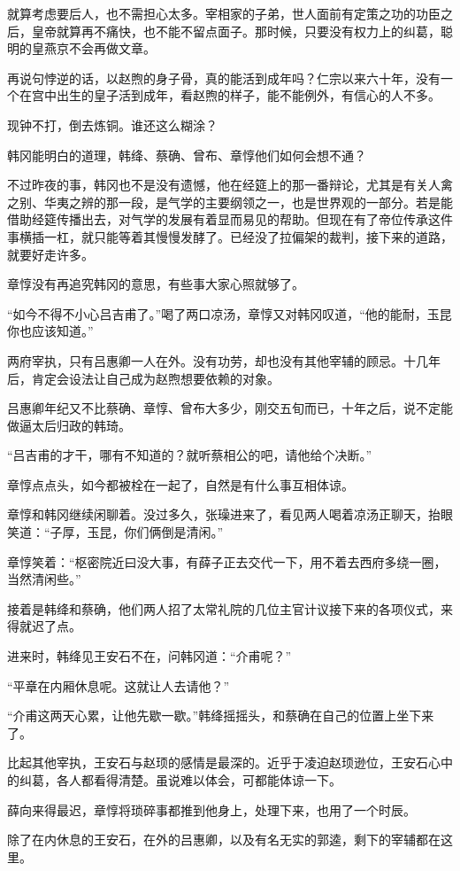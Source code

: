 就算考虑要后人，也不需担心太多。宰相家的子弟，世人面前有定策之功的功臣之后，皇帝就算再不痛快，也不能不留点面子。那时候，只要没有权力上的纠葛，聪明的皇燕京不会再做文章。

再说句悖逆的话，以赵煦的身子骨，真的能活到成年吗？仁宗以来六十年，没有一个在宫中出生的皇子活到成年，看赵煦的样子，能不能例外，有信心的人不多。

现钟不打，倒去炼铜。谁还这么糊涂？

韩冈能明白的道理，韩绛、蔡确、曾布、章惇他们如何会想不通？

不过昨夜的事，韩冈也不是没有遗憾，他在经筵上的那一番辩论，尤其是有关人禽之别、华夷之辨的那一段，是气学的主要纲领之一，也是世界观的一部分。若是能借助经筵传播出去，对气学的发展有着显而易见的帮助。但现在有了帝位传承这件事横插一杠，就只能等着其慢慢发酵了。已经没了拉偏架的裁判，接下来的道路，就要好走许多。

章惇没有再追究韩冈的意思，有些事大家心照就够了。

“如今不得不小心吕吉甫了。”喝了两口凉汤，章惇又对韩冈叹道，“他的能耐，玉昆你也应该知道。”

两府宰执，只有吕惠卿一人在外。没有功劳，却也没有其他宰辅的顾忌。十几年后，肯定会设法让自己成为赵煦想要依赖的对象。

吕惠卿年纪又不比蔡确、章惇、曾布大多少，刚交五旬而已，十年之后，说不定能做逼太后归政的韩琦。

“吕吉甫的才干，哪有不知道的？就听蔡相公的吧，请他给个决断。”

章惇点点头，如今都被栓在一起了，自然是有什么事互相体谅。

章惇和韩冈继续闲聊着。没过多久，张璪进来了，看见两人喝着凉汤正聊天，抬眼笑道：“子厚，玉昆，你们俩倒是清闲。”

章惇笑着：“枢密院近曰没大事，有薛子正去交代一下，用不着去西府多绕一圈，当然清闲些。”

接着是韩绛和蔡确，他们两人招了太常礼院的几位主官计议接下来的各项仪式，来得就迟了点。

进来时，韩绛见王安石不在，问韩冈道：“介甫呢？”

“平章在内厢休息呢。这就让人去请他？”

“介甫这两天心累，让他先歇一歇。”韩绛摇摇头，和蔡确在自己的位置上坐下来了。

比起其他宰执，王安石与赵顼的感情是最深的。近乎于凌迫赵顼逊位，王安石心中的纠葛，各人都看得清楚。虽说难以体会，可都能体谅一下。

薛向来得最迟，章惇将琐碎事都推到他身上，处理下来，也用了一个时辰。

除了在内休息的王安石，在外的吕惠卿，以及有名无实的郭逵，剩下的宰辅都在这里。


